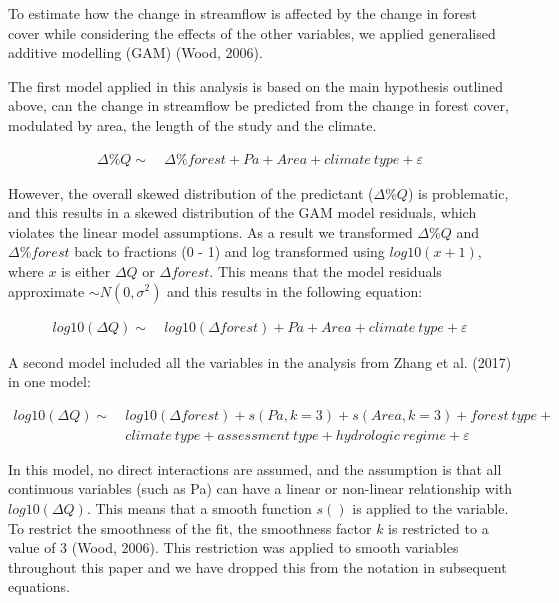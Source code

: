 \documentclass[]{elsarticle} %
\begin{document}
To estimate how the change in streamflow is affected by the change in
forest cover while considering the effects of the other variables, we
applied generalised additive modelling (GAM) (Wood, 2006).

The first model applied in this analysis is based on the main hypothesis
outlined above, can the change in streamflow be predicted from the
change in forest cover, modulated by area, the length of the study and
the climate.

\[\tag{1}
\begin{aligned}
\Delta \%Q \sim ~&\Delta \%forest + Pa + Area + {climate~type} + \varepsilon
\end{aligned}\]

However, the overall skewed distribution of the predictant
(\(\Delta \%Q\)) is problematic, and this results in a skewed
distribution of the GAM model residuals, which violates the linear model
assumptions. As a result we transformed \(\Delta \%Q\) and
\(\Delta \%forest\) back to fractions (0 - 1) and log transformed using
\(log10(x + 1)\), where \(x\) is either \(\Delta Q\) or
\(\Delta forest\). This means that the model residuals approximate
\(\sim N(0,\sigma^2)\) and this results in the following equation:

\[\tag{2}
\begin{aligned}
log10(\Delta Q) \sim ~ &log10(\Delta forest) + Pa + Area + {climate~type} + \varepsilon
\end{aligned}\]

A second model included all the variables in the analysis from Zhang et
al. (2017) in one model:

\[\tag{3}
\begin{aligned}
log10(\Delta Q) \sim ~&log10(\Delta forest) + s(Pa, k = 3) + s(Area, k = 3) +  {forest~type} + \\  &{climate~type} + {assessment~type} + {hydrologic~regime} + \varepsilon
\end{aligned}\]

In this model, no direct interactions are assumed, and the assumption is
that all continuous variables (such as Pa) can have a linear or
non-linear relationship with \(log10(\Delta Q)\). This means that a
smooth function \(s()\) is applied to the variable. To restrict the
smoothness of the fit, the smoothness factor \(k\) is restricted to a
value of 3 (Wood, 2006). This restriction was applied to smooth
variables throughout this paper and we have dropped this from the
notation in subsequent equations.
\end{document}
